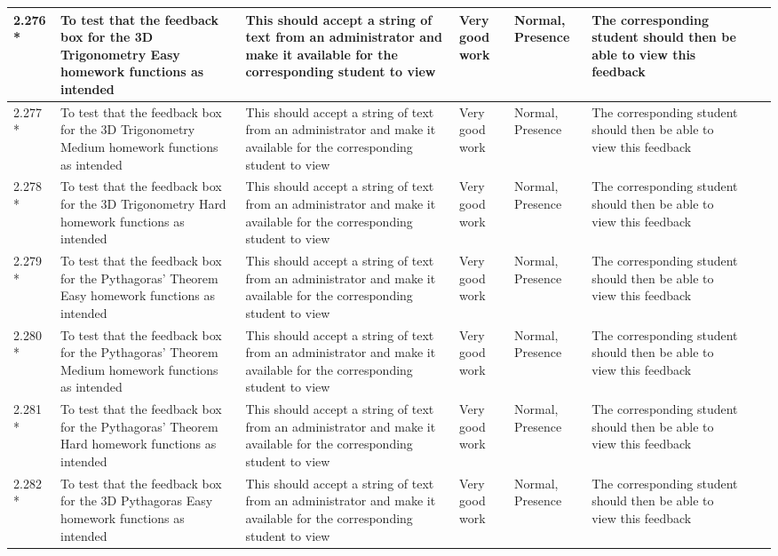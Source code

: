\begin{landscape}
\begin{center}
\begin{longtable}{|p{1.5cm}|p{2.5cm}|p{2.5cm}|p{2cm}|p{2cm}|p{2cm}|p{2cm}|p{2cm}|}
2.276 * & To test that the feedback box for the 3D Trigonometry Easy homework functions as intended & This should accept a string of text from an administrator and make it available for the corresponding student to view & Very good work & Normal, Presence & The corresponding student should then be able to view this feedback & & \\ \hline
2.277 * & To test that the feedback box for the 3D Trigonometry Medium homework functions as intended & This should accept a string of text from an administrator and make it available for the corresponding student to view & Very good work & Normal, Presence & The corresponding student should then be able to view this feedback & & \\ \hline
2.278 * & To test that the feedback box for the 3D Trigonometry Hard homework functions as intended & This should accept a string of text from an administrator and make it available for the corresponding student to view & Very good work & Normal, Presence & The corresponding student should then be able to view this feedback & & \\ \hline
2.279 * & To test that the feedback box for the Pythagoras' Theorem Easy homework functions as intended & This should accept a string of text from an administrator and make it available for the corresponding student to view & Very good work & Normal, Presence & The corresponding student should then be able to view this feedback & & \\ \hline
2.280 * & To test that the feedback box for the Pythagoras' Theorem Medium homework functions as intended & This should accept a string of text from an administrator and make it available for the corresponding student to view & Very good work & Normal, Presence & The corresponding student should then be able to view this feedback & & \\ \hline
2.281 * & To test that the feedback box for the Pythagoras' Theorem Hard homework functions as intended & This should accept a string of text from an administrator and make it available for the corresponding student to view & Very good work & Normal, Presence & The corresponding student should then be able to view this feedback & & \\ \hline
2.282 * & To test that the feedback box for the 3D Pythagoras Easy homework functions as intended & This should accept a string of text from an administrator and make it available for the corresponding student to view & Very good work & Normal, Presence & The corresponding student should then be able to view this feedback & & \\ \hline

\end{longtable}
\end{center}
\end{landscape}
